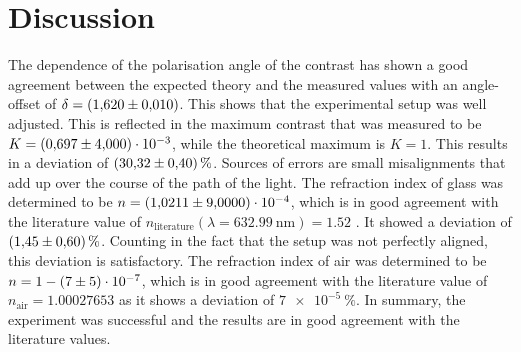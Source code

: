 \section{Discussion}
\label{sec:Discussion}

The dependence of the polarisation angle of the contrast has shown a good agreement between the expected theory and the measured values with an angle-offset of $\delta=\SI{1.620\pm 0.010}{}$.
This shows that the experimental setup was well adjusted.
This is reflected in the maximum contrast that was measured to be $K= \SI{0.697\pm 4e-3}{}$, while the theoretical maximum is $K=1$. 
This results in a deviation of $\SI{30.32\pm0.4}{\percent}$.
Sources of errors are small misalignments that add up over the course of the path of the light. \newline
The refraction index of glass was determined to be $n=\num{1.0211\pm 9e-4}$, which is in good agreement with the literature value of $n_{\text{literature}}(\lambda=\SI{632.99}{\nano\meter})=\num{1.52}$ \cite{RefractiveIndex}.
It showed a deviation of $\SI{1.45\pm 0.6}{\percent}$.
Counting in the fact that the setup was not perfectly aligned, this deviation is satisfactory.
The refraction index of air was determined to be $n=1-\num{7 \pm 5 e-7}$, which is in good agreement with the literature value of $n_{\text{air}}=\num{1.00027653}$ \cite{RefractiveIndex} as it shows a deviation of $\SI{7e-5}{\percent}$.
In summary, the experiment was successful and the results are in good agreement with the literature values.